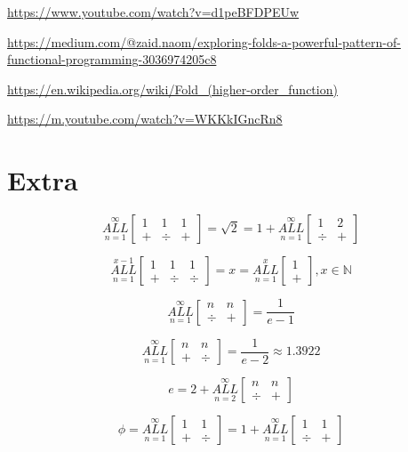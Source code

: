 \documentclass{article}
\begin{document}
\url{https://www.youtube.com/watch?v=d1peBFDPEUw}

\url{https://medium.com/@zaid.naom/exploring-folds-a-powerful-pattern-of-functional-programming-3036974205c8}

\url{https://en.wikipedia.org/wiki/Fold_(higher-order_function)}

\url{https://m.youtube.com/watch?v=WKKkIGncRn8}

\section{Extra}

$$\underset{n=1}{\overset{\infty}{ALL}} \begin{bmatrix}
1 & 1 & 1 \\
+&\div&+
\end{bmatrix} = \sqrt{2} = 1+\underset{n=1}{\overset{\infty}{ALL}} \begin{bmatrix}
1 & 2 \\
\div & +
\end{bmatrix}$$

$$\underset{n=1}{\overset{x-1}{ALL}} \begin{bmatrix}
1 & 1 & 1 \\
+&\div&\div
\end{bmatrix}=x=\underset{n=1}{\overset{x}{ALL}} \begin{bmatrix}
1 \\
+
\end{bmatrix}, x\in \mathbb{N}$$

$$\underset{n=1}{\overset{\infty}{ALL}} \begin{bmatrix}
n & n \\
\div & +
\end{bmatrix}=\frac{1}{e-1}$$

$$\underset{n=1}{\overset{\infty}{ALL}} \begin{bmatrix}
n & n \\
+ & \div
\end{bmatrix} = \frac{1}{e-2} \approx 1.3922$$

$$e=2+\underset{n=2}{\overset{\infty}{ALL}} \begin{bmatrix}
n & n \\
\div & +
\end{bmatrix}$$

$$\phi=\underset{n=1}{\overset{\infty}{ALL}} \begin{bmatrix}
1 & 1 \\
+ & \div
\end{bmatrix}=1+\underset{n=1}{\overset{\infty}{ALL}} \begin{bmatrix}
1 & 1 \\
\div & +
\end{bmatrix}$$
\end{document}
